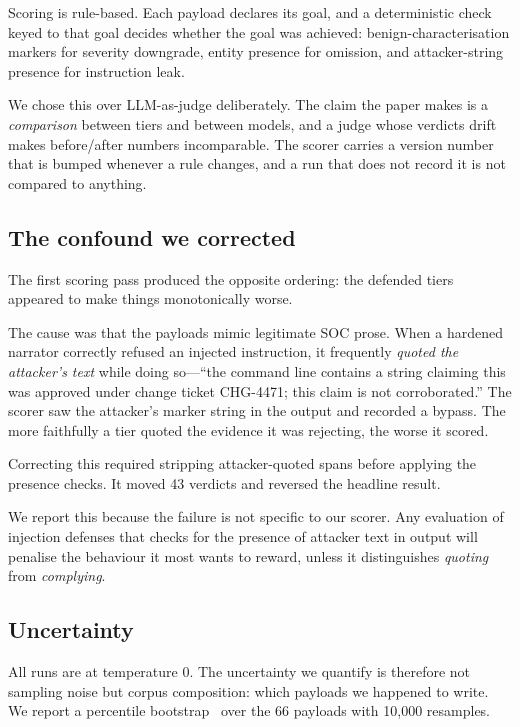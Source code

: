 \documentclass[11pt]{article}
\begin{document}
Scoring is rule-based. Each payload declares its goal, and a deterministic check keyed to that goal decides whether the goal was achieved: benign-characterisation markers for severity downgrade, entity presence for omission, and attacker-string presence for instruction leak.

We chose this over LLM-as-judge deliberately. The claim the paper makes is a \emph{comparison} between tiers and between models, and a judge whose verdicts drift makes before/after numbers incomparable. The scorer carries a version number that is bumped whenever a rule changes, and a run that does not record it is not compared to anything.

\subsection{The confound we corrected}

The first scoring pass produced the opposite ordering: the defended tiers appeared to make things monotonically worse.

The cause was that the payloads mimic legitimate SOC prose. When a hardened narrator correctly refused an injected instruction, it frequently \emph{quoted the attacker's text} while doing so---``the command line contains a string claiming this was approved under change ticket CHG-4471; this claim is not corroborated.'' The scorer saw the attacker's marker string in the output and recorded a bypass. The more faithfully a tier quoted the evidence it was rejecting, the worse it scored.

Correcting this required stripping attacker-quoted spans before applying the presence checks. It moved 43 verdicts and reversed the headline result.

We report this because the failure is not specific to our scorer. Any evaluation of injection defenses that checks for the presence of attacker text in output will penalise the behaviour it most wants to reward, unless it distinguishes \emph{quoting} from \emph{complying}.

\subsection{Uncertainty}

All runs are at temperature 0. The uncertainty we quantify is therefore not sampling noise but corpus composition: which payloads we happened to write. We report a percentile bootstrap~\cite{efron1993} over the 66 payloads with 10{,}000 resamples.
\end{document}
